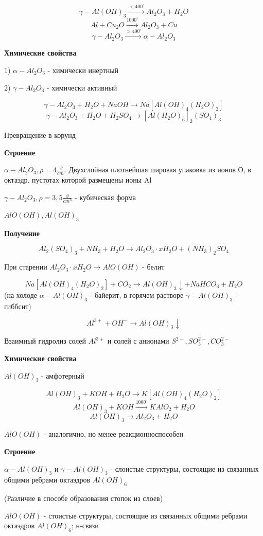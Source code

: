 $$\gamma-Al(OH)_3 \xrightarrow{<400^{\circ}} Al_2O_3 + H_2O$$
$$Al + Cu_2O \xrightarrow{1000^{\circ}} Al_2O_3 + Cu$$
$$\gamma-Al_2O_3 \xrightarrow{>400^{\circ}} \alpha-Al_2O_3$$

\textbf{Химические свойства}

1) $\alpha-Al_2O_3$ - химически инертный

2) $\gamma-Al_2O_3$ - химически активный

$$\gamma-Al_2O_3 + H_2O + NaOH \rightarrow Na[Al(OH)_4(H_2O)_2]$$
$$\gamma-Al_2O_3 + H_2O + H_2SO_4 \rightarrow [Al(H_2O)_6]_2(SO_4)_3$$

Превращение в корунд

\textbf{Строение}

$\alpha-Al_2O_3,\rho = 4 \frac{g}{cm^3}$
Двухслойная плотнейшая шаровая упаковка из ионов О, в октаэдр. пустотах которой размещены ионы Al

$\gamma-Al_2O_3, \rho = 3,5 \frac{g}{cm^3}$ - кубическая форма

$AlO(OH), Al(OH)_3$

\textbf{Получение}

$$Al_2(SO_4)_3 + NH_3 + H_2O \rightarrow Al_2O_3\cdot xH_2O + (NH_3)_2SO_4$$

При старении $Al_2O_3\cdot xH_2O \rightarrow AlO(OH)$ - белит

$$Na[Al(OH)_4(H_2O)_2] + CO_2 \rightarrow Al(OH)_3\downarrow + NaHCO_3 + H_2O$$
(на холоде $\alpha-Al(OH)_3$ - байерит, в горячем растворе $\gamma-Al(OH)_3$ - гиббсит)

$$Al^{3+} + OH^- \rightarrow Al(OH)_3\downarrow$$

Взаимный гидролиз солей $Al^{3+}$ и солей с анионами $S^{2-}, SO_3^{2-}, CO_3^{2-}$

\textbf{Химические свойства}

$Al(OH)_3$ - амфотерный

$$Al(OH)_3 + KOH + H_2O \rightarrow K[Al(OH)_4(H_2O)_2]$$
$$Al(OH)_3 + KOH \xrightarrow{1000^{\circ}} KAlO_2 + H_2O$$
$$Al(OH)_3 \rightarrow Al_2O_3 + H_2O$$

$AlO(OH)$ - аналогично, но менее реакционноспособен

\textbf{Строение}

$\alpha-Al(OH)_3$ и $\gamma-Al(OH)_3$ - слоистые структуры, состоящие из связанных общими ребрами октаэдров $Al(OH)_6$

(Различие в способе образования стопок из слоев)

$AlO(OH)$ - стоистые структуры, состоящие из связанных общими ребрами октаэдров $Al(OH)_6$; н-связи

